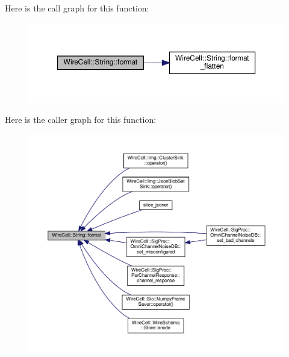 Here is the call graph for this function\+:
\nopagebreak
\begin{figure}[H]
\begin{center}
\leavevmode
\includegraphics[width=350pt]{namespace_wire_cell_1_1_string_ade706f4cfc3f6e8a946d95f1b06dbb56_cgraph}
\end{center}
\end{figure}
Here is the caller graph for this function\+:
\nopagebreak
\begin{figure}[H]
\begin{center}
\leavevmode
\includegraphics[width=350pt]{namespace_wire_cell_1_1_string_ade706f4cfc3f6e8a946d95f1b06dbb56_icgraph}
\end{center}
\end{figure}
\mbox{\label{namespace_wire_cell_1_1_string_a483dc976ea784d91bef184a893e9bba8}} 
